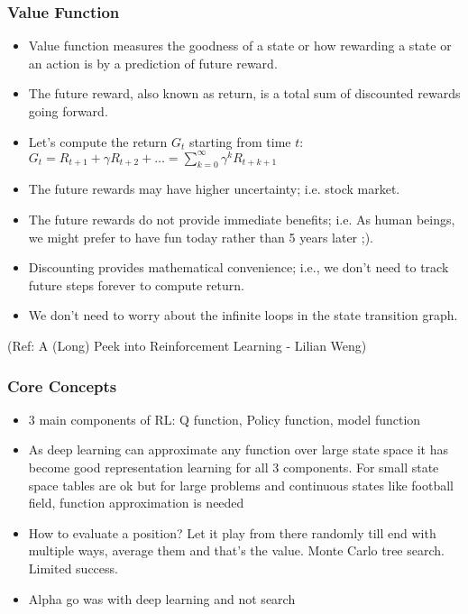 \begin{frame}[fragile]\frametitle{Value Function}


\begin{itemize}
\item Value function measures the goodness of a state or how rewarding a state or an action is by a
prediction of future reward. 
\item The future reward, also known as return, is a total sum of discounted rewards going forward. 
\item Let’s compute the return $G_t$ starting from time $t$: $G_t = R_{t+1} + \gamma R_{t+2} + \ldots = \sum_{k=0}^{\infty} \gamma^kR_{t+k+1}$
\item The future rewards may have higher uncertainty; i.e. stock market.
\item The future rewards do not provide immediate benefits; i.e. As human beings, we might prefer to
have fun today rather than 5 years later ;).
\item Discounting provides mathematical convenience; i.e., we don’t need to track future steps forever to
compute return.
\item We don’t need to worry about the infinite loops in the state transition graph.
\end{itemize}



{\tiny (Ref: A (Long) Peek into Reinforcement Learning - Lilian Weng)}


\end{frame}

\begin{frame}[fragile]\frametitle{Core Concepts}


\begin{itemize}
\item 3 main components of RL: Q function, Policy function, model function
\item As deep learning can approximate any function over large state space it has become good representation learning for all 3 components. For small state space tables are ok but for large problems and continuous states like football field, function approximation is needed
\item How to evaluate a position? Let it play from there randomly till end with multiple ways, average them and that's the value. Monte Carlo tree search. Limited success.
\item Alpha go was with deep learning and not search

\end{itemize}

\end{frame}

